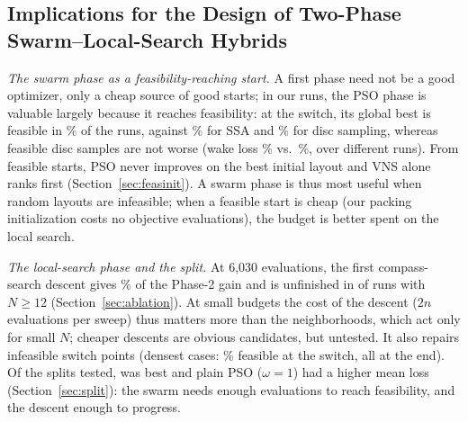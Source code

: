 \subsection{Implications for the Design of Two-Phase Swarm--Local-Search Hybrids}
\label{sec:disc-hybrids}
\emph{The swarm phase as a feasibility-reaching start.} A first phase need not be a good optimizer, only a cheap source of good starts; in our runs, the PSO phase is valuable largely because it reaches feasibility: at the switch, its global best is feasible in \NSwitchFeasPSOVNS\% of the runs, against \NSwitchFeasSSAVNS\% for SSA and \NSwitchFeasRSDVNS\% for disc sampling, whereas feasible disc samples are not worse (wake loss \NSwitchLossRSDVNS\% vs.\ \NSwitchLossPSOVNS\%, over different runs). From feasible starts, PSO never improves on the best initial layout and VNS alone ranks first (Section~\ref{sec:feasinit}). A swarm phase is thus most useful when random layouts are infeasible; when a feasible start is cheap (our packing initialization costs no objective evaluations), the budget is better spent on the local search.

\emph{The local-search phase and the split.} At 6,030 evaluations, the first compass-search descent gives \NDDescentSharePSOVNS\% of the Phase-2 gain and is unfinished in \NDDescentUnfinishedLargePSOVNS{} of \NDRunsLargePSOVNS{} runs with $N\ge12$ (Section~\ref{sec:ablation}). At small budgets the cost of the descent ($2n$ evaluations per sweep) thus matters more than the neighborhoods, which act only for small $N$; cheaper descents are obvious candidates, but untested. It also repairs infeasible switch points (densest cases: \NDenseSwitchFeas\% feasible at the switch, all at the end). Of the splits tested, \NSplitBestSetting{} was best and plain PSO ($\omega=1$) had a higher mean loss (Section~\ref{sec:split}): the swarm needs enough evaluations to reach feasibility, and the descent enough to progress.

